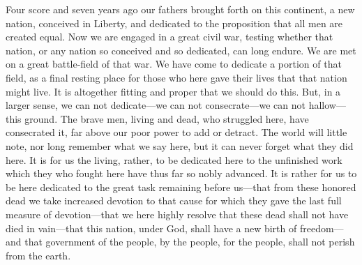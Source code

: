 \documentclass{article}
\begin{document}
Four score and seven years ago our fathers brought forth on this continent, a new nation, conceived in Liberty, and dedicated to the proposition that all men are created equal.
Now we are engaged in a great civil war, testing whether that nation, or any nation so conceived and so dedicated, can long endure. We are met on a great battle-field of that war. We have come to dedicate a portion of that field, as a final resting place for those who here gave their lives that that nation might live. It is altogether fitting and proper that we should do this.
But, in a larger sense, we can not dedicate—we can not consecrate—we can not hallow—this ground. The brave men, living and dead, who struggled here, have consecrated it, far above our poor power to add or detract. The world will little note, nor long remember what we say here, but it can never forget what they did here. It is for us the living, rather, to be dedicated here to the unfinished work which they who fought here have thus far so nobly advanced. It is rather for us to be here dedicated to the great task remaining before us—that from these honored dead we take increased devotion to that cause for which they gave the last full measure of devotion—that we here highly resolve that these dead shall not have died in vain—that this nation, under God, shall have a new birth of freedom—and that government of the people, by the people, for the people, shall not perish from the earth.
\end{document}

